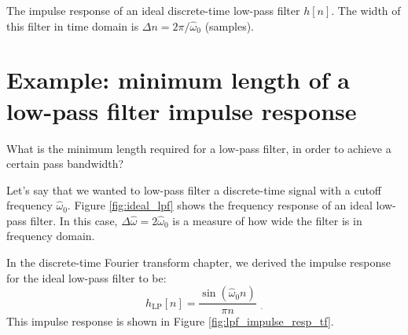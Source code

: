 \begin{marginfigure}
  \begin{center}
  \end{center}
  \caption{The impulse response of an ideal discrete-time low-pass filter $h[n]$.
    The width of this filter in time domain is $\Delta n = 2\pi/\hat{\omega}_0$ (samples).}
  \label{fig:lpf_impulse_resp_tf}
\end{marginfigure}

\section{Example: minimum length of a low-pass filter impulse response}

What is the minimum length required for a low-pass filter, in order to achieve a certain pass bandwidth?

Let's say that we wanted to low-pass filter a discrete-time signal
with a cutoff frequency $\hat{\omega}_0$. Figure \ref{fig:ideal_lpf}
shows the frequency response of an ideal low-pass filter. In this case,
$\Delta \hat{\omega} = 2\hat{\omega}_0$ is a measure of how wide the
filter is in frequency domain.

In the discrete-time Fourier transform chapter, we derived the impulse
response for the ideal low-pass filter to be:
\begin{equation}
  h_{\mathrm{LP}}[n] = \frac{\sin(\hat{\omega}_0 n)}{\pi n} \,\, _.
\end{equation}
This impulse response is shown in
Figure \ref{fig:lpf_impulse_resp_tf}.


